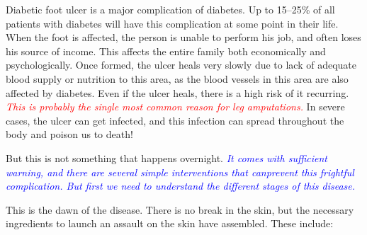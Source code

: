 Diabetic foot ulcer is a major compli\-cation of diabetes. Up to 15–25\% of all patients with diabetes will have this complication at some point in their life. When the foot is affected, the person is unable to perform his job, and often loses his source of income. This affects the entire family both economically and psychologically. Once formed, the ulcer heals very slowly due to lack of adequate blood supply or nutrition to this area, as the blood vessels in this area are also affected by diabetes. Even if the ulcer heals, there is a high risk of it recurring. \textcolor{red}{\textit{This is probably the single most common reason for leg amputations.}} In severe cases, the ulcer can get infected, and this infection can spread throughout the body and poison us to death!

But this is not something that happens overnight. \textcolor{blue}{\textit{It comes with suffi\-cient warning, and there are several simple interventions that can\break prevent this frightful complication. But first we need to understand the diffe\-rent stages of this disease.}}


This is the dawn of the disease. There is no break in the skin, but the necessary ingredients to launch an assault on the skin have assembled. These include:

